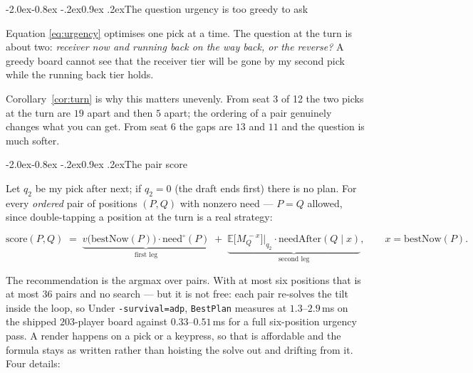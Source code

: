 \documentclass[10pt,a4paper]{article}
\makeatletter
\theoremstyle{plain}
\theoremstyle{definition}
\theoremstyle{remark}
\newcommand{\code}[1]{\texttt{\small #1}}
\renewcommand\subsection{\@startsection{subsection}{2}{\z@}%
  {-2.0ex\@plus -0.8ex \@minus -.2ex}{0.9ex \@plus .2ex}{\normalfont\large\bfseries}}
\makeatother
\begin{document}
\subsection{The question urgency is too greedy to ask}

Equation \eqref{eq:urgency} optimises one pick at a time. The question at the turn is
about two: \emph{receiver now and running back on the way back, or the reverse?} A greedy
board cannot see that the receiver tier will be gone by my second pick while the running
back tier holds.

Corollary~\ref{cor:turn} is why this matters unevenly. From seat 3 of 12 the two picks at
the turn are $19$ apart and then $5$ apart; the ordering of a pair genuinely changes what
you can get. From seat 6 the gaps are $13$ and $11$ and the question is much softer.

\subsection{The pair score}

Let $q_2$ be my pick after next; if $q_2 = 0$ (the draft ends first) there is no plan.
For every \emph{ordered} pair of positions $(P, Q)$ with nonzero need --- $P = Q$
allowed, since double-tapping a position at the turn is a real strategy:

\begin{equation}
\mathrm{score}(P,Q) \;=\; \underbrace{v\big(\mathrm{bestNow}(P)\big)\cdot \mathrm{need}^{\circ}(P)}_{\text{first leg}}
\;+\; \underbrace{\mathbb{E}\big[M_Q^{\,-x}\big]\big|_{q_2}\cdot \mathrm{needAfter}(Q \mid x)}_{\text{second leg}},
\qquad x = \mathrm{bestNow}(P).
\label{eq:plan}
\end{equation}

The recommendation is the argmax over pairs. With at most six positions that is at most
$36$ pairs and no search --- but it is not free: each pair re-solves the tilt inside the
loop, so Under \code{-survival=adp}, \code{BestPlan} measures at $1.3$--$2.9$\,ms on the shipped $203$-player board
against $0.33$--$0.51$\,ms for a full six-position urgency pass. A render happens on a
pick or a keypress, so that is affordable and the formula stays as written rather than
hoisting the solve out and drifting from it. Four details:
\end{document}
